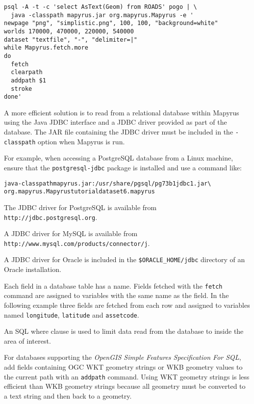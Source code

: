 \begin{verbatim}
psql -A -t -c 'select AsText(Geom) from ROADS' pogo | \
  java -classpath mapyrus.jar org.mapyrus.Mapyrus -e '
newpage "png", "simplistic.png", 100, 100, "background=white"
worlds 170000, 470000, 220000, 540000
dataset "textfile", "-", "delimiter=|"
while Mapyrus.fetch.more
do
  fetch
  clearpath
  addpath $1
  stroke
done'
\end{verbatim}

A more efficient solution is to read from a relational database within Mapyrus
using the Java JDBC interface and a JDBC driver provided
as part of the database.  The JAR file containing the
JDBC driver must be included in the \texttt{-classpath} option
when Mapyrus is run.

For example, when accessing a PostgreSQL database from a Linux
machine, ensure that the \texttt{postgresql-jdbc} package is
installed and use a command like:

\begin{alltt}
java -classpath mapyrus.jar:/usr/share/pgsql/pg73b1jdbc1.jar \textbackslash
  org.mapyrus.Mapyrus tutorialdataset6.mapyrus
\end{alltt}

The JDBC driver for PostgreSQL is available from
\texttt{http://jdbc.postgresql.org}.

A JDBC driver for MySQL is available from
\newline
\texttt{http://www.mysql.com/products/connector/j}.

A JDBC driver for Oracle is included in the
\texttt{\$ORACLE\_HOME/jdbc} directory of an Oracle installation.

Each field in a database table has a name.
Fields fetched with the
\texttt{fetch}
command are assigned to variables with the same name as the field.
In the following example three fields are fetched from each
row and assigned to variables named
\texttt{longitude}, \texttt{latitude} and \texttt{assetcode}.

An SQL where clause is used to limit data read from
the database to inside the area of interest.



For databases supporting the \textit{OpenGIS Simple Features Specification For
SQL}, add fields containing OGC WKT geometry strings or WKB geometry values
to the current path with an \texttt{addpath} command.  Using WKT geometry
strings is less efficient than WKB geometry strings because all geometry
must be converted to a text string and then back to a geometry.

